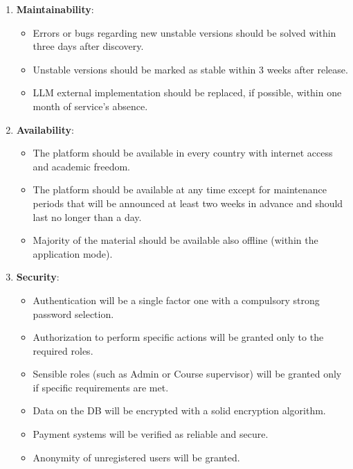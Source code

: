 \begin{enumerate}
	\item \textbf{Maintainability}: 
	\begin{itemize}
		\item Errors or bugs regarding new unstable versions should be solved within three days after discovery.
		\item Unstable versions should be marked as stable within 3 weeks after release.
		\item LLM external implementation should be replaced, if possible, within one month of service's absence.
	\end{itemize}
	
	\item \textbf{Availability}: 
	\begin{itemize}
		\item The platform should be available in every country with internet access and academic freedom.
		\item The platform should be available at any time except for maintenance periods that will be announced at least two weeks in advance and should last no longer than a day.
		\item Majority of the material should be available also offline (within the application mode).
	\end{itemize}
	
	\item \textbf{Security}: 
	\begin{itemize}
		\item Authentication will be a single factor one with a compulsory strong password selection.
		\item Authorization to perform specific actions will be granted only to the required roles.
		\item Sensible roles (such as Admin or Course supervisor) will be granted only if specific requirements are met.
		\item Data on the DB will be encrypted with a solid encryption algorithm.
		\item Payment systems will be verified as reliable and secure.
		\item Anonymity of unregistered users will be granted.
	\end{itemize}
	

\end{enumerate}
